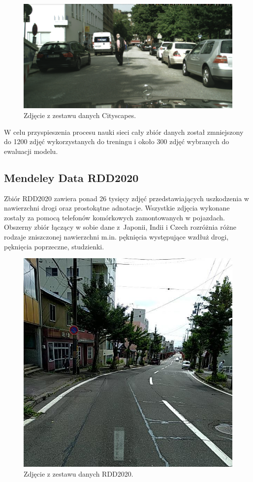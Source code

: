 \begin{figure}[H]
    \centering
    \includegraphics[width=0.9\linewidth]{Obrazy/Rozdzial04/cityscapes.png}
    \caption{Zdjęcie z zestawu danych Cityscapes.}
    \label{fig:cityscapes}
\end{figure}


\hspace{0.5cm}
W celu przyspieszenia procesu nauki sieci cały zbiór danych został zmniejszony do 1200 zdjęć wykorzystanych do treningu i około 300 zdjęć wybranych do ewaluacji modelu.

\subsection{Mendeley Data RDD2020}

\hspace{0.5cm}
Zbiór RDD2020\cite{MendeleyData} zawiera ponad 26 tysięcy zdjęć przedstawiających uszkodzenia w nawierzchni drogi oraz prostokątne adnotacje. Wszystkie zdjęcia wykonane zostały za pomocą telefonów komórkowych zamontowanych w pojazdach. Obszerny zbiór łączący w sobie dane z~Japonii, Indii i Czech rozróżnia różne rodzaje zniszczonej nawierzchni m.in. pęknięcia występujące wzdłuż drogi, pęknięcia poprzeczne, studzienki.

\begin{figure}[H]
    \centering
    \includegraphics[width=0.5\linewidth]{Obrazy/Rozdzial04/mendeley.jpg}
    \caption{Zdjęcie z zestawu danych RDD2020.}
    \label{fig:mendeley}
\end{figure}


